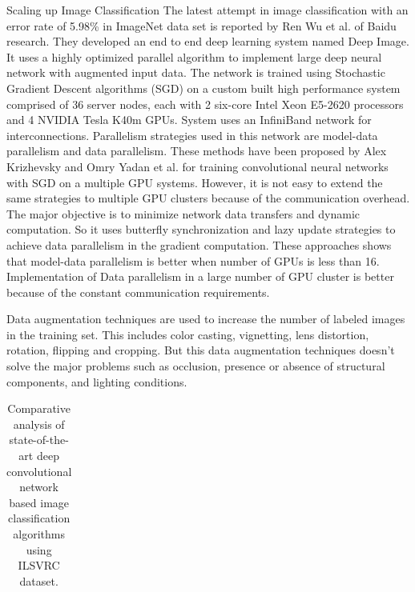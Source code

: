 \documentclass{article}
\begin{document}
\begin{subsection}{Scaling up Image Classification}
The latest attempt in image classification with an error rate of 5.98\% in ImageNet data set is reported by Ren Wu et al. \cite{Wu2015} of Baidu research. They developed an end to end deep learning  system named Deep Image. It uses a highly optimized parallel algorithm to implement large deep neural network with augmented input data. The network is trained using Stochastic Gradient Descent algorithms (SGD) on a custom built high performance system comprised of 36 server nodes, each with 2 six-core Intel Xeon E5-2620 processors and 4 NVIDIA Tesla K40m GPUs. System  uses an InfiniBand  network for interconnections. Parallelism strategies used in this network are model-data parallelism and data parallelism. These methods have been proposed by Alex Krizhevsky \cite{Krizhevsky2014} and Omry Yadan et al. \cite{Yadan2013} for training convolutional neural networks with SGD on a  multiple GPU systems. However, it is not easy to extend the same strategies to multiple GPU clusters because of the communication overhead. The major objective is to minimize network data transfers and dynamic computation. So it uses butterfly synchronization and lazy update strategies to achieve data parallelism in the gradient computation. These approaches shows that model-data parallelism is better when number of GPUs is less than 16. Implementation of Data parallelism in a large number of GPU cluster is better because of the constant communication requirements.
\par
Data augmentation techniques are used to increase the number of labeled images in the training set. This includes color casting, vignetting, lens distortion, rotation, flipping and cropping. But this data augmentation techniques  doesn't solve the major problems such as occlusion, presence or absence of structural components, and lighting conditions.
\centering
\begin{table}[ht]
\captionsetup{justification=centering,belowskip=2pt,aboveskip=2pt}
\caption[]{ Comparative analysis of state-of-the-art deep convolutional network based image classification algorithms using ILSVRC dataset.}
 \begin{tabular}{ | p{2.7cm} | l | p{1.4cm} |p{1.3cm} |p{.8cm} |p{1.3cm} |p{1.1cm} |p{5cm}|}


\end{tabular}
\end{table}
\end{subsection}
\end{document}
